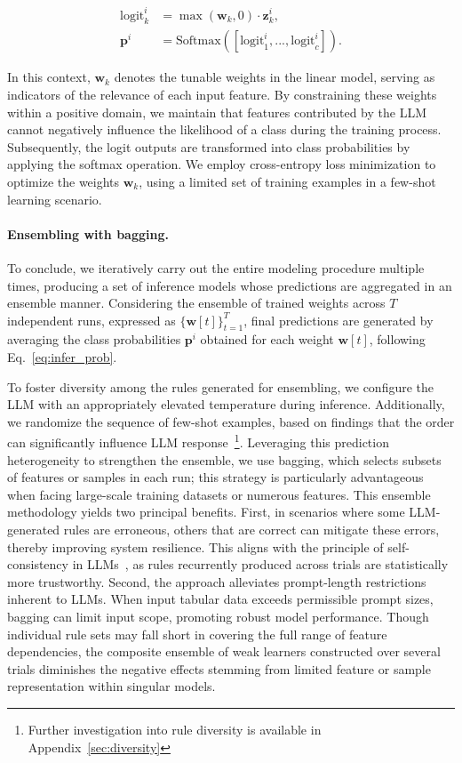 \begin{align}
\text{logit}_k^i &= \max(\mathbf{w}_k, 0) \cdot \mathbf{z}_k^i, \nonumber \\
\mathbf{p}^i &= \text{Softmax}({[\text{logit}_{1}^i, ..., \text{logit}_{c}^i]}). \label{eq:infer_prob}
\end{align}

In this context, $\mathbf{w}_k$ denotes the tunable weights in the linear model, serving as indicators of the relevance of each input feature. By constraining these weights within a positive domain, we maintain that features contributed by the LLM cannot negatively influence the likelihood of a class during the training process. Subsequently, the logit outputs are transformed into class probabilities by applying the softmax operation. We employ cross-entropy loss minimization to optimize the weights $\mathbf{w}_k$, using a limited set of training examples in a few-shot learning scenario.

\vspace*{-0.12in}
\paragraph{Ensembling with bagging.} To conclude, we iteratively carry out the entire modeling procedure multiple times, producing a set of inference models whose predictions are aggregated in an ensemble manner. Considering the ensemble of trained weights across $T$ independent runs, expressed as $\{\mathbf{w}[t]\}_{t=1}^T$, final predictions are generated by averaging the class probabilities $\mathbf{p}^i$ obtained for each weight $\mathbf{w}[t]$, following Eq.~\ref{eq:infer_prob}.

To foster diversity among the rules generated for ensembling, we configure the LLM with an appropriately elevated temperature during inference. Additionally, we randomize the sequence of few-shot examples, based on findings that the order can significantly influence LLM response~\cite{lu2022fantastically}\footnote{Further investigation into rule diversity is available in Appendix~\ref{sec:diversity}}. Leveraging this prediction heterogeneity to strengthen the ensemble, we use bagging, which selects subsets of features or samples in each run; this strategy is particularly advantageous when facing large-scale training datasets or numerous features. This ensemble methodology yields two principal benefits. First, in scenarios where some LLM-generated rules are erroneous, others that are correct can mitigate these errors, thereby improving system resilience. This aligns with the principle of self-consistency in LLMs~\cite{wang2022self}, as rules recurrently produced across trials are statistically more trustworthy. Second, the approach alleviates prompt-length restrictions inherent to LLMs. When input tabular data exceeds permissible prompt sizes, bagging can limit input scope, promoting robust model performance. Though individual rule sets may fall short in covering the full range of feature dependencies, the composite ensemble of weak learners constructed over several trials diminishes the negative effects stemming from limited feature or sample representation within singular models.

